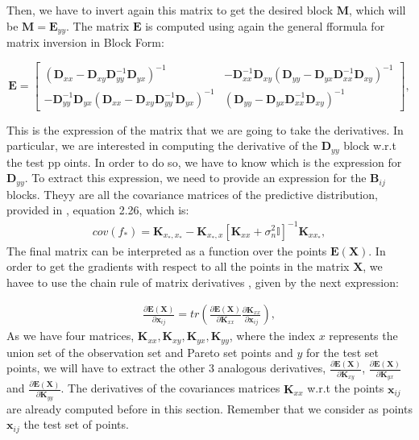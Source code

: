 Then, we have to invert again this matrix to get the desired block $\mathbf{M}$, which will be $\mathbf{M} = \mathbf{E}_{yy}$. The matrix $\mathbf{E}$ is computed using again the general fformula for matrix inversion in Block Form:

\[
\mathbf{E}=
\left[
\begin{array}{c|c}
(\mathbf{D}_{xx}-\mathbf{D}_{xy}\mathbf{D}_{yy}^{-1}\mathbf{D}_{yx})^{-1} & -\mathbf{D}_{xx}^{-1}\mathbf{D}_{xy}(\mathbf{D}_{yy}-\mathbf{D}_{yx}\mathbf{D}_{xx}^{-1}\mathbf{D}_{xy})^{-1}\\
\hline
-\mathbf{D}_{yy}^{-1}\mathbf{D}_{yx}(\mathbf{D}_{xx}-\mathbf{D}_{xy}\mathbf{D}_{yy}^{-1}\mathbf{D}_{yx})^{-1} & (\mathbf{D}_{yy}-\mathbf{D}_{yx}\mathbf{D}_{xx}^{-1}\mathbf{D}_{xy})^{-1}
\end{array}
\right],
\]

This is the expression of the matrix that we are going to take the derivatives. In particular, we are interested in computing the derivative of the $\mathbf{D}_{yy}$ block w.r.t the test pp
oints. In order to do so, we have to know which is the expression for $\mathbf{D}_{yy}$. To extract this expression, we need to provide an expression for the $\mathbf{B}_{ij}$ blocks. Theyy
 are all the covariance matrices of the predictive distribution, provided in \cite{rasmussen2003gaussian}, equation 2.26, which is:
\begin{align}
cov(f_*) = \mathbf{K}_{x_*,x_*} - \mathbf{K}_{x_*,x}[\mathbf{K}_{xx}+\sigma_n^2\mathbb{I}]^{-1}\mathbf{K}_{xx_*},
\end{align}
The final matrix can be interpreted as a function over the points $\mathbf{E}(\mathbf{X})$. In order to get the gradients with respect to all the points in the matrix $\mathbf{X}$, we havee to use the chain rule of matrix derivatives \cite{petersen2012},
given by the next expression:

\begin{align}
\frac{\partial \mathbf{E}(\mathbf{X})}{\partial \mathbf{x}_{ij}} = tr(\frac{\partial \mathbf{E}(\mathbf{X})}{\partial \mathbf{K}_{xx}} \frac{\partial \mathbf{K}_{xx}}{\partial \mathbf{x}_{ij}}),
\end{align}
As we have four matrices, $\mathbf{K}_{xx}, \mathbf{K}_{xy}, \mathbf{K}_{yx}, \mathbf{K}_{yy}$, where the index $x$ represents the union set of the observation set and Pareto set points and $y$ for the test set points, we will have to extract the other 3 analogous derivatives, $\frac{\partial \mathbf{E}(\mathbf{X})}{\partial \mathbf{K}_{xy}}$, $\frac{\partial \mathbf{E}(\mathbf{X})}{\partial \mathbf{K}_{yx}}$ and $\frac{\partial \mathbf{E}(\mathbf{X})}{\partial \mathbf{K}_{yy}}$. The derivatives of the covariances matrices $\mathbf{K}_{xx}$ w.r.t the points $\mathbf{x}_{ij}$ are already computed before in this section. Remember that we consider as points $\mathbf{x}_{ij}$ the test set of points.

